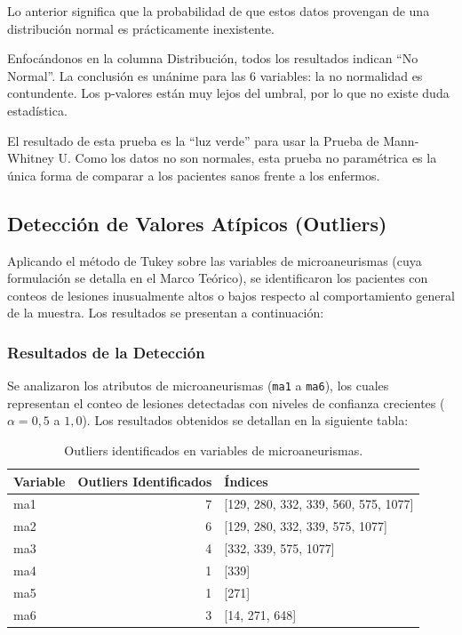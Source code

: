 Lo anterior significa que la probabilidad de que estos datos provengan de una distribución normal es prácticamente inexistente.

Enfocándonos en la columna Distribución, todos los resultados indican ``No Normal''. La conclusión es unánime para las 6 variables: la no normalidad es contundente. Los p-valores están muy lejos del umbral, por lo que no existe duda estadística.
  
El resultado de esta prueba es la \enquote{luz verde} para usar la Prueba de Mann-Whitney U. Como los datos no son normales, esta prueba no paramétrica es la única forma de comparar a los pacientes sanos frente a los enfermos.

\subsection{Detección de Valores Atípicos (Outliers)}

Aplicando el método de Tukey sobre las variables de microaneurismas (cuya formulación se detalla en el Marco Teórico), se identificaron los pacientes con conteos de lesiones inusualmente altos o bajos respecto al comportamiento general de la muestra. Los resultados se presentan a continuación:

\subsubsection{Resultados de la Detección}

Se analizaron los atributos de microaneurismas (\texttt{ma1} a \texttt{ma6}), los cuales representan el conteo de lesiones detectadas con niveles de confianza crecientes ($\alpha = 0{,}5$ a $1{,}0$). Los resultados obtenidos se detallan en la siguiente tabla:

\begin{table}[htbp]
\centering
\caption{Outliers identificados en variables de microaneurismas.}
\begin{tabular}{lrl}
\toprule
Variable & Outliers Identificados & Índices \\
\midrule
ma1 & 7 & [129, 280, 332, 339, 560, 575, 1077] \\
ma2 & 6 & [129, 280, 332, 339, 575, 1077] \\
ma3 & 4 & [332, 339, 575, 1077] \\
ma4 & 1 & [339] \\
ma5 & 1 & [271] \\
ma6 & 3 & [14, 271, 648] \\
\bottomrule
\end{tabular}
\end{table}

